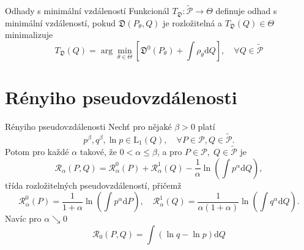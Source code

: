 \documentclass[11pt,a4paper]{beamer}
\begin{document}
%		

\begin{frame}{Odhady s minimální vzdáleností}
	Funkcionál $T_\mathfrak{D}:\mathcal{\tilde{P}} \rightarrow \Theta$ definuje odhad s minimální vzdáleností, pokud  $\mathfrak{D}(P_\theta,Q)$ je rozložitelná a $T_\mathfrak{D}(Q) \in \Theta$ minimalizuje   
	\begin{equation*}
		T_\mathfrak{D}(Q) = \arg \min_{\theta \in \Theta} \left[ \mathfrak{D}^0 (P_\theta) + \int \rho_\theta \mathrm{d}Q \right], \quad \forall Q \in \mathcal{\tilde{P}}
	\end{equation*}
\end{frame}

\section{Rényiho pseudovzdálenosti} %

\begin{frame}{Rényiho pseudovzdálenosti}
	Nechť pro nějaké $\beta>0$ platí 
	\begin{equation*}
			p^\beta, q^\beta,\ln{p} \in \mathrm{L}_1(Q), \quad \forall P \in \mathcal{P}, Q \in \mathcal{\tilde{P}}.
	\end{equation*}
		Potom pro každé $\alpha$ takové, že $0 < \alpha \leq \beta$, a pro $P \in \mathcal{P}, \; Q \in \mathcal{\tilde{P}} $ je 
	\begin{equation*}
		\mathcal{R}_\alpha (P,Q) = \mathcal{R}_\alpha^0 (P) + \mathcal{R}_\alpha^1 (Q) - \dfrac{1}{\alpha} \ln{\left( \int{p^\alpha \mathrm{d}Q } \right)},
	\end{equation*}	
	třída rozložitelných pseudovzdáleností, přičemž 
	\begin{equation*}
		\mathcal{R}_\alpha^0 (P) = \dfrac{1}{1+\alpha}\ln{\left( \int{p^\alpha \mathrm{d}P } \right)}, \quad \mathcal{R}_\alpha^1 (Q) = \dfrac{1}{\alpha (1+\alpha)}\ln{\left( \int{q^\alpha \mathrm{d}Q } \right)}.
	\end{equation*}
	Navíc pro $\alpha \searrow 0$
	\begin{equation*}
		\mathcal{R}_0 (P,Q) = \int{\left( \ln{q} - \ln{p} \right)\mathrm{d}Q}
	\end{equation*}
\end{frame}
\end{document}
